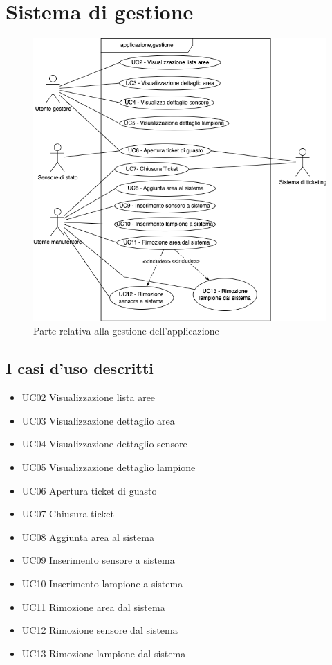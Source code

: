 \section{Sistema di gestione}

\begin{figure}[H]
    \includegraphics[width=\textwidth]{contenuti/img/casi_uso_grafici-applicazione,gestione.png}
    \caption{Parte relativa alla gestione dell'applicazione}
    \label{fig:gestione}
\end{figure}

\subsection{I casi d'uso descritti}

\begin{itemize}
    \item UC02 Visualizzazione lista aree
    \item UC03 Visualizzazione dettaglio area
    \item UC04 Visualizzazione dettaglio sensore
    \item UC05 Visualizzazione dettaglio lampione
    \item UC06 Apertura ticket di guasto
    \item UC07 Chiusura ticket
    \item UC08 Aggiunta area al sistema
    \item UC09 Inserimento sensore a sistema
    \item UC10 Inserimento lampione a sistema
    \item UC11 Rimozione area dal sistema
    \item UC12 Rimozione sensore dal sistema
    \item UC13 Rimozione lampione dal sistema
\end{itemize}

